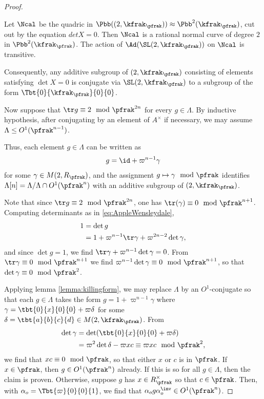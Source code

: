 \begin{proof}
    \begin{lemma}\label{lemma:killingform}
        Let $\Ncal$ be the quadric in $\Pbb(\sl(2,\kfrak_\pfrak))\approx \Pbb^2(\kfrak_\pfrak)$, cut out by the equation $det X =0$. Then $\Ncal$ is a rational normal curve of degree $2$ in $\Pbb^2(\kfrak_\pfrak)$. The action of $\Ad(\SL(2,\kfrak_\pfrak))$ on $\Ncal$ is transitive.

        Consequently, any additive subgroup of $\sl(2,\kfrak_\pfrak)$ consisting of elements satisfying $\det X = 0$ is conjugate via $\SL(2,\kfrak_\pfrak)$ to a subgroup of the form $\Tbt{0}{\kfrak_\pfrak}{0}{0}$.
    \end{lemma}
    Now suppose that $\tr g \equiv 2 \mod \pfrak^{2n}$ for every $g\in \Lambda$. By inductive hypothesis, after conjugating by an element of $A^\times$ if necessary, we may assume $\Lambda \leq O^1(\pfrak^{n-1})$.

    Thus, each element $g\in \Lambda$ can be written as
    \begin{align}\label{eq:AppleWensleydale}
        g = \id +\varpi^{n-1} \gamma
    \end{align}
    for some $\gamma \in M(2, R_\pfrak)$, and the assignment $g \mapsto \gamma \mod \pfrak$ identifies $\Lambda[n] = \Lambda /\Lambda \cap O^1(\pfrak^n)$ with an additive subgroup of $\sl(2,\kfrak_\pfrak)$.

    Note that since $\tr g \equiv 2 \mod \pfrak^{2n}$, one has $\tr(\gamma) \equiv 0 \mod \pfrak^{n+1}$.
    Computing determinants as in \ref{eq:AppleWensleydale},
    \begin{align*}
        1 & = \det g                                                  \\
          & = 1 + \varpi^{n-1} \tr \gamma + \varpi^{2n-2}\det \gamma,
    \end{align*}
    and since $\det g =1$, we find $\tr \gamma +\varpi^{n-1}\det \gamma =0$. From $\tr \gamma  \equiv 0 \mod \pfrak^{n+1}$ we find $ \varpi^{n-1}\det \gamma \equiv 0 \mod \pfrak^{n+1}$, so that $\det \gamma \equiv 0 \mod \pfrak^2$.

    Applying lemma \ref{lemma:killingform}, we may replace $\Lambda$ by an $O^1$-conjugate so that each $g \in \Lambda$ takes the form $g = 1 + \varpi^{n-1}\gamma$ where $\gamma = \tbt{0}{x}{0}{0} +\varpi\delta$ for some $\delta =\tbt{a}{b}{c}{d} \in M(2,\kfrak_\pfrak)$. From
    \begin{align*}
        \det \gamma & = \det (\tbt{0}{x}{0}{0} +\varpi\delta)                              \\
                    & = \varpi^2 \det \delta - \varpi x c  \equiv \varpi xc \mod \pfrak^2,
    \end{align*}
    we find that $xc \equiv 0 \mod \pfrak$, so that either $x$ or $c$ is in $\pfrak$. If $x\in \pfrak$, then $g \in O^1(\pfrak^n)$ already. If this is so for all $g \in \Lambda$, then the claim is proven. Otherwise, suppose $g$ has $x \in R_\pfrak^\times$ so that $c \in \pfrak$. Then, with $\alpha_o = \Tbt{\varpi}{0}{0}{1}$, we find that $\alpha_o g \alpha_o^\inv \in O^1(\pfrak^n)$.


\end{proof}
